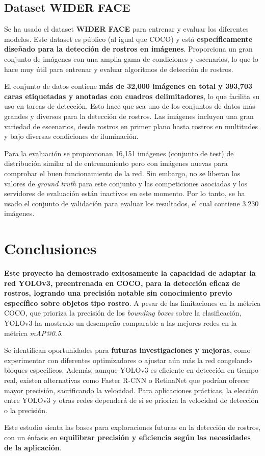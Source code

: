 \documentclass[10pt,twocolumn,letterpaper]{article}
\begin{document}
\subsection{Dataset WIDER FACE}

Se ha usado el dataset \textbf{WIDER FACE} para entrenar y evaluar los diferentes modelos. Este dataset es público (al igual que COCO) y está \textbf{específicamente diseñado para la detección de rostros en imágenes}. Proporciona un gran conjunto de imágenes con una amplia gama de condiciones y escenarios, lo que
 lo hace muy útil para entrenar y evaluar algoritmos de detección de rostros.

El conjunto de datos contiene \textbf{más de 32,000 imágenes en total y 393,703 caras etiquetadas y anotadas con cuadros delimitadores}, lo que facilita su uso en tareas de detección. Esto hace que sea uno de los conjuntos de datos más grandes y
 diversos para la detección de rostros. Las imágenes incluyen una gran variedad de escenarios, desde rostros en primer plano hasta rostros en multitudes y bajo diversas condiciones de iluminación.

Para la evaluación se proporcionan 16,151 imágenes (conjunto de test) de distribución similar al de entrenamiento pero con imágenes nuevas para comprobar el buen funcionamiento de la red. Sin embargo, no se liberan los valores de \textit{ground truth} para este conjunto y las competiciones asociadas y los servidores de evaluación están inactivos en este momento. Por lo tanto, se ha usado el conjunto de validación para evaluar los resultados, el cual contiene 3.230 imágenes.

\section{Conclusiones}

\textbf{Este proyecto ha demostrado exitosamente la capacidad de adaptar la red YOLOv3, preentrenada en COCO, para la detección eficaz de rostros, logrando una precisión notable sin conocimiento previo específico sobre objetos tipo rostro}. A pesar de las limitaciones en la métrica COCO, que prioriza la precisión de los \textit{bounding boxes} sobre la clasificación, YOLOv3 ha mostrado un desempeño comparable a las mejores redes en la métrica \textit{mAP@0.5}.

Se identifican oportunidades para \textbf{futuras investigaciones y mejoras}, como experimentar con diferentes optimizadores o ajustar aún más la red congelando bloques específicos. Además, aunque YOLOv3 es eficiente en detección en tiempo real, existen alternativas como Faster R-CNN o RetinaNet que podrían ofrecer mayor precisión, sacrificando la velocidad. Para aplicaciones prácticas, la elección entre YOLOv3 y otras redes dependerá de si se prioriza la velocidad de detección o la precisión.

Este estudio sienta las bases para exploraciones futuras en la detección de rostros, con un énfasis en \textbf{equilibrar precisión y eficiencia según las necesidades de la aplicación}. \\ \\ \\

{\small


}
\end{document}
